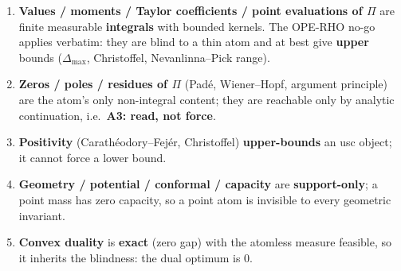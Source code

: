 \begin{enumerate}
\item \textbf{Values / moments / Taylor coefficients / point evaluations of $\Pi$} are finite
  measurable \textbf{integrals} with bounded kernels. The OPE-RHO no-go applies verbatim: they
  are blind to a thin atom and at best give \textbf{upper} bounds ($\Delta_{\max}$, Christoffel,
  Nevanlinna--Pick range).
\item \textbf{Zeros / poles / residues of $\Pi$} (Pad\'e, Wiener--Hopf, argument principle) are
  the atom's only non-integral content; they are reachable only by analytic continuation, i.e.\
  \textbf{A3: read, not force}.
\item \textbf{Positivity} (Carath\'eodory--Fej\'er, Christoffel) \textbf{upper-bounds} an usc
  object; it cannot force a lower bound.
\item \textbf{Geometry / potential / conformal / capacity} are \textbf{support-only}; a point mass
  has zero capacity, so a point atom is invisible to every geometric invariant.
\item \textbf{Convex duality} is \textbf{exact} (zero gap) with the atomless measure feasible, so
  it inherits the blindness: the dual optimum is $0$.
\end{enumerate}

